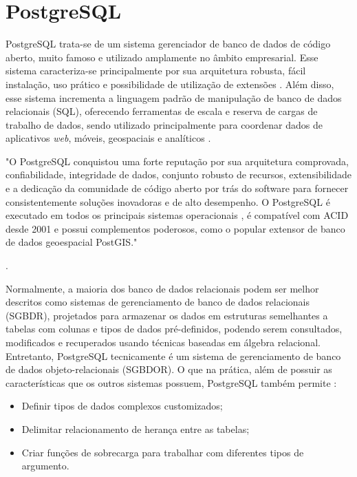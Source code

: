 \section{PostgreSQL}
\label{sec:postgresql}
PostgreSQL trata-se de um sistema gerenciador de banco de dados de código aberto, muito famoso e utilizado amplamente no âmbito empresarial. Esse sistema caracteriza-se principalmente por sua arquitetura robusta, fácil instalação, uso prático e possibilidade de utilização de extensões \cite{PostgreSQL2023}. Além disso, esse sistema incrementa a linguagem padrão de manipulação de banco de dados relacionais (SQL), oferecendo ferramentas de escala e reserva de cargas de trabalho de dados, sendo utilizado principalmente para coordenar dados de aplicativos \textit{web}, móveis, geospaciais e analíticos \cite{Kinsta2023}.

\begin{citacao}
    "O PostgreSQL conquistou uma forte reputação por sua arquitetura comprovada, confiabilidade, integridade de dados, conjunto robusto de recursos, extensibilidade e a dedicação da comunidade de código aberto por trás do software para fornecer consistentemente soluções inovadoras e de alto desempenho. O PostgreSQL é executado em todos os principais sistemas operacionais , é compatível com ACID desde 2001 e possui complementos poderosos, como o popular extensor de banco de dados geoespacial PostGIS."

    \cite{PostgreSQL2023}.
\end{citacao}

Normalmente, a maioria dos banco de dados relacionais podem ser melhor descritos como sistemas de gerenciamento de banco de dados relacionais (SGBDR), projetados para armazenar os dados em estruturas semelhantes a tabelas com colunas e tipos de dados pré-definidos, podendo serem consultados, modificados e recuperados usando técnicas baseadas em álgebra relacional. Entretanto, PostgreSQL tecnicamente é um sistema de gerenciamento de banco de dados objeto-relacionais (SGBDOR). O que na prática, além de possuir as características que os outros sistemas possuem, PostgreSQL também permite \cite{Prisma2020}:

\begin{itemize}
    \item Definir tipos de dados complexos customizados;
    \item Delimitar relacionamento de herança entre as tabelas;
    \item Criar funções de sobrecarga para trabalhar com diferentes tipos de argumento.
\end{itemize} 

